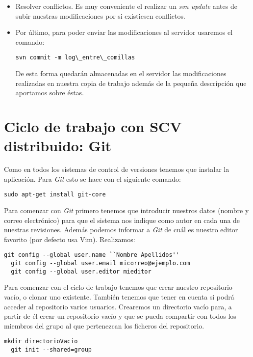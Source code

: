 \begin{itemize}
\item Resolver conflictos. Es muy conveniente el realizar un
  \textit{svn update} antes de subir nuestras modificaciones por si
  existiesen conflictos. 

\item Por último, para poder enviar las modificaciones al servidor
  usaremos el comando:
  \begin{lstlisting}[style=consola]
    svn commit -m log\_entre\_comillas
  \end{lstlisting}
  De esta forma quedarán almacenadas en el servidor las modificaciones
  realizadas en nuestra copia de trabajo además de la pequeña
  descripción que aportamos sobre éstas.
\end{itemize}
  

\section{Ciclo de trabajo con \textbf{SCV} distribuido: Git}

Como en todos los sistemas de control de versiones tenemos que
instalar la aplicación. Para \textit{Git} esto se hace con el
siguiente comando:
\begin{lstlisting}[style=consola]
  sudo apt-get install git-core
\end{lstlisting}

Para comenzar con \textit{Git} primero tenemos que introducir nuestros
datos (nombre y correo electrónico) para que el sistema nos indique
como autor en cada una de nuestras revisiones. Además podemos informar
a \textit{Git} de cuál es nuestro editor favorito (por defecto usa
Vim). Realizamos:
\begin{lstlisting}[style=consola]
  git config --global user.name ``Nombre Apellidos''
  git config --global user.email micorreo@ejemplo.com
  git config --global user.editor mieditor
\end{lstlisting}

Para comenzar con el ciclo de trabajo tenemos que crear nuestro
repositorio vacío, o clonar uno existente. También tenemos que tener
en cuenta si podrá acceder al repositorio varios usuarios. Crearemos
un directorio vacío para, a partir de él crear un repositorio vacío
y que se pueda compartir con todos los miembros del grupo al que
pertenezcan los ficheros del repositorio.
\begin{lstlisting}[style=consola]
  mkdir directorioVacio
  git init --shared=group
\end{lstlisting}

